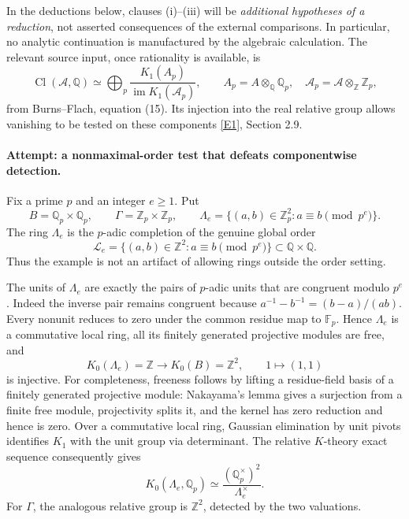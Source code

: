 \documentclass[11pt,a4paper]{article}
\newcommand{\Z}{\mathbb{Z}}
\newcommand{\Q}{\mathbb{Q}}
\newcommand{\F}{\mathbb{F}}
\newcommand{\eref}[2]{\hyperlink{extra:#1:#2}{[E#2]}}
\numberwithin{equation}{section}
\begin{document}
In the deductions below, clauses (i)--(iii) will be \emph{additional hypotheses of a reduction}, not asserted consequences of the external comparisons. In particular, no analytic continuation is manufactured by the algebraic calculation. The relevant source input, once rationality is available, is
\begin{equation}\label{r58:localization}
 \operatorname{Cl}(\mathcal A,\Q)
 \simeq\bigoplus_p
 \frac{K_1(A_p)}{\operatorname{im}K_1(\mathcal A_p)},
 \qquad A_p=A\otimes_{\Q}\Q_p,
 \quad\mathcal A_p=\mathcal A\otimes_{\Z}\Z_p,
\end{equation}
from Burns--Flach, equation (15). Its injection into the real relative group allows vanishing to be tested on these components \eref{58}{1}, Section 2.9.

\paragraph{Attempt: a nonmaximal-order test that defeats componentwise detection.}
Fix a prime $p$ and an integer $e\geq1$. Put
\[
 B=\Q_p\times\Q_p,\qquad
 \Gamma=\Z_p\times\Z_p,\qquad
 \Lambda_e=\{(a,b)\in\Z_p^2:a\equiv b\pmod{p^e}\}.
\]
The ring $\Lambda_e$ is the $p$-adic completion of the genuine global order
\[
 \mathcal L_e=\{(a,b)\in\Z^2:a\equiv b\pmod{p^e}\}
                           \subset\Q\times\Q.
\]
Thus the example is not an artifact of allowing rings outside the order setting.

The units of $\Lambda_e$ are exactly the pairs of $p$-adic units that are congruent modulo $p^e$. Indeed the inverse pair remains congruent because
$a^{-1}-b^{-1}=(b-a)/(ab)$. Every nonunit reduces to zero under the common residue map to $\F_p$. Hence $\Lambda_e$ is a commutative local ring, all its finitely generated projective modules are free, and
\[
 K_0(\Lambda_e)=\Z\longrightarrow K_0(B)=\Z^2,
 \qquad 1\longmapsto(1,1)
\]
is injective. For completeness, freeness follows by lifting a residue-field basis of a finitely generated projective module: Nakayama's lemma gives a surjection from a finite free module, projectivity splits it, and the kernel has zero reduction and hence is zero. Over a commutative local ring, Gaussian elimination by unit pivots identifies $K_1$ with the unit group via determinant. The relative $K$-theory exact sequence consequently gives
\begin{equation}\label{r58:toyrelative}
 K_0(\Lambda_e,\Q_p)\simeq
       \frac{(\Q_p^\times)^2}{\Lambda_e^\times}.
\end{equation}
For $\Gamma$, the analogous relative group is $\Z^2$, detected by the two valuations.
\end{document}
